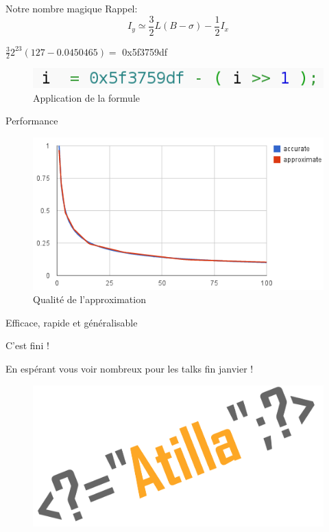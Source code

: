 \documentclass{beamer}
\begin{document}
\begin{frame}{Notre nombre magique}
Rappel:
$$ I_y \simeq \frac{3}{2}L(B - \sigma) -\frac{1}{2}I_x $$

$\frac{3}{2}2^{23}(127  - 0.0450465) = $ 0x5f3759df
\begin{figure}
\includegraphics[scale=0.5]{img/magic.png}
\caption{Application de la formule}
\end{figure}

\end{frame}

\begin{frame}{Performance}
\begin{figure}
\includegraphics[scale=0.4]{img/res.png}
\caption{Qualité de l'approximation}
\end{figure}
Efficace, rapide et généralisable
\end{frame}
 
\begin{frame}{C'est fini !}
	\begin{huge}
	En espérant vous voir nombreux pour les talks fin janvier !
	\end{huge}
	\begin{figure}
	\includegraphics[scale=0.1]{img/logo-atilla.png}	
	\end{figure}

\end{frame} 
 
\end{document}
